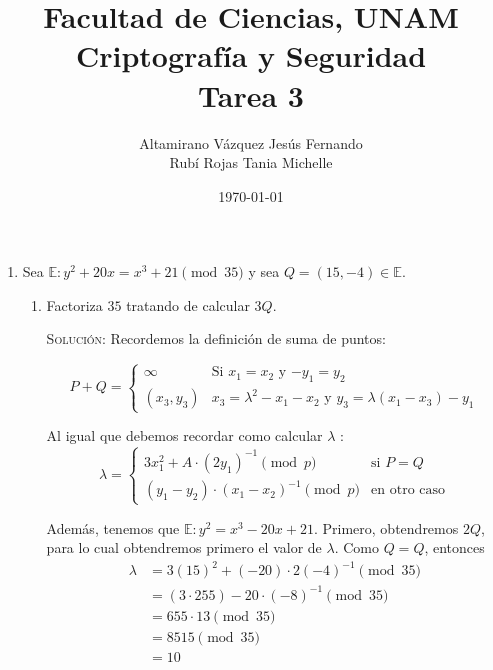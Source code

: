 \documentclass[letterpaper,11pt]{article}
\title{Facultad de Ciencias, UNAM \\ Criptografía y Seguridad \\ Tarea 3}
\author{Altamirano Vázquez Jesús Fernando \\
        Rubí Rojas Tania Michelle}
\date{\today}
\begin{document}
\maketitle

\begin{enumerate}
    \item Sea $\mathbb{E} : y^2 + 20x = x^3 + 21 \pmod{35}$ y sea $Q = (15, -4) 
    \in \mathbb{E}$.
    \begin{enumerate}
        \item Factoriza $35$ tratando de calcular $3Q$.

        \textsc{Solución:} Recordemos la definición de suma de puntos:
        
        \begin{equation*}
            P + Q =
            \begin{cases}
                \infty & \text{Si $x_1 = x_2$ y $-y_1 = y_2$}\\
                (x_3,y_3) & \text{$x_3 = \lambda^2 - x_1 - x_2$ y $y_3 = 
                \lambda (x_1 - x_3) - y_1$}
            \end{cases}       
        \end{equation*}
        
        Al igual que debemos recordar como calcular $\lambda$ :
        \begin{equation*}
            \lambda =
            \begin{cases}
                3x_1^2 + A \cdot (2y_1)^{-1} \pmod{p} & 
                \text{si $P = Q$} \\
                (y_1-y_2) \cdot (x_1 - x_2)^{-1} \pmod{p} & 
                \text{en otro caso}
            \end{cases}       
        \end{equation*}

        Además, tenemos que $\mathbb{E} : y^2 = x^3 - 20x + 21$. Primero, 
        obtendremos $2Q$, para lo cual obtendremos primero el valor de 
        $\lambda$. Como $Q = Q$, entonces 
        \begin{align*}
            \lambda
            &= 3(15)^2 + (-20) \cdot 2(-4)^{-1} \pmod{35} \\ 
            &= (3 \cdot 255) - 20 \cdot (-8)^{-1} \pmod{35} \\
            &= 655 \cdot 13 \pmod{35} \\ 
            &= 8515 \pmod{35} \\
            &= 10
        \end{align*}
        

\end{enumerate}
\end{enumerate}
\end{document}
